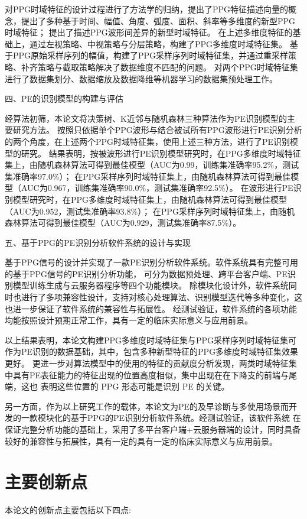 对PPG时域特征的设计过程进行了方法学的归纳，提出了PPG特征描述向量的概念，提出了多种基于时间、幅值、角度、弧度、面积、斜率等多维度的新型PPG时域特征；
提出了描述PPG波形间差异的新型时域特征。
在上述多维度特征的基础上，通过左视策略、中视策略与分层策略，构建了PPG多维度时域特征集。
基于PPG原始采样序列的幅值，构建了PPG采样序列时域特征集，并通过重采样策略、补齐策略与截取策略解决了数据维度不匹配的问题。
对两个PPG时域特征集进行了数据集划分、数据缩放及数据降维等机器学习的数据集预处理工作。

四、PE的识别模型的构建与评估

经算法初筛，本论文将决策树、K近邻与随机森林三种算法作为PE识别模型的主要研究方法。
按照只依据单个PPG波形与结合被试所有PPG波形进行PE识别分析的两个角度，在上述两个PPG时域特征集，使用上述三种方法，进行了PE识别模型的研究。
结果表明，按被波形进行PE识别模型研究时，在PPG多维度时域特征集上，由随机森林算法可得到最佳模型（AUC为0.99，训练集准确率95.2\%，测试集准确率97.0\%）；
在PPG采样序列时域特征集上，由随机森林算法可得到最佳模型（AUC为0.967，训练集准确率90.0\%，测试集准确率92.5\%）。
在波形进行PE识别模型研究时，在PPG多维度时域特征集上，由随机森林算法可得到最佳模型（AUC为0.952，测试集准确率93.8\%）；
在PPG采样序列时域特征集上，由随机森林算法可得到最佳模型（AUC为0.929，测试集准确率87.5\%）。

五、基于PPG的PE识别分析软件系统的设计与实现

基于PPG信号的设计并实现了一款PE识别分析软件系统。软件系统具有完整可用的基于PPG信号的PE识别分析功能，
可分为数据预处理、跨平台客户端、PE识别模型训练生成与云服务器程序等四个功能模块。
除模块化设计外，软件系统同时也进行了多项兼容性设计，支持对核心处理算法、识别模型迭代等多种变化，这也进一步保证了软件系统的兼容性与拓展性。
经测试验证，软件系统的各项功能均能按照设计预期正常工作，具有一定的临床实际意义与应用前景。

以上结果表明，本论文构建PPG多维度时域特征集与PPG采样序列时域特征集可作为PE识别的数据基础，其中，包含多种新型特征的PPG多维度时域特征集效果更好。
更进一步对算法模型中的使用的特征的贡献度分析发现，两类时域特征集中具有PE表征能力的特征出现的位置高度相似，集中出现在在下降支的前端与尾端，这也
表明这些位置的 PPG 形态可能是识别 PE 的关键。

另一方面，作为以上研究工作的载体，本论文为PE的及早诊断与多使用场景而开发的一款模块化的基于PPG的PE识别分析软件系统。经测试验证，该软件系统
在保证完整分析功能的基础上，采用了多平台客户端+云服务器端的设计，同时具备较好的兼容性与拓展性，具有一定的具有一定的临床实际意义与应用前景。
\section{主要创新点}
本论文的创新点主要包括以下四点:

